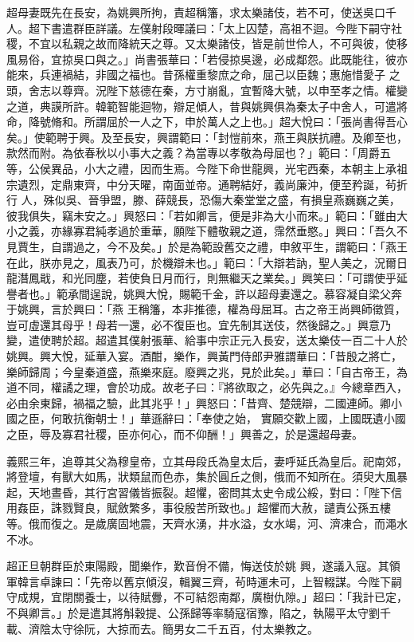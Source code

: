 \begin{pinyinscope}
 超母妻既先在長安，為姚興所拘，責超稱籓，求太樂諸伎，若不可，使送吳口千人。超下書遣群臣詳議。左僕射段暉議曰：「太上囚楚，高祖不迴。今陛下嗣守社稷，不宜以私親之故而降統天之尊。又太樂諸伎，皆是前世伶人，不可與彼，使移風易俗，宜掠吳口與之。」尚書張華曰：「若侵掠吳邊，必成鄰怨。此既能往，彼亦能來，兵連禍結，非國之福也。昔孫權重黎庶之命，屈己以臣魏；惠施惜愛子
 之頭，舍志以尊齊。況陛下慈德在秦，方寸崩亂，宜暫降大號，以申至孝之情。權變之道，典謨所許。韓範智能迴物，辯足傾人，昔與姚興俱為秦太子中舍人，可遣將命，降號脩和。所謂屈於一人之下，申於萬人之上也。」超大悅曰：「張尚書得吾心矣。」使範聘于興。及至長安，興謂範曰：「封愷前來，燕王與朕抗禮。及卿至也，款然而附。為依春秋以小事大之義？為當專以孝敬為母屈也？」範曰：「周爵五等，公侯異品，小大之禮，因而生焉。今陛下命世龍興，光宅西秦，本朝主上承祖宗遺烈，定鼎東齊，中分天曜，南面並帝。通聘結好，義尚廉沖，便至矜誕，茍折行
 人，殊似吳、晉爭盟，滕、薛競長，恐傷大秦堂堂之盛，有損皇燕巍巍之美，彼我俱失，竊未安之。」興怒曰：「若如卿言，便是非為大小而來。」範曰：「雖由大小之義，亦緣寡君純孝過於重華，願陛下體敬親之道，霈然垂愍。」興曰：「吾久不見賈生，自謂過之，今不及矣。」於是為範設舊交之禮，申敘平生，謂範曰：「燕王在此，朕亦見之，風表乃可，於機辯未也。」範曰：「大辯若訥，聖人美之，況爾日龍潛鳳戢，和光同塵，若使負日月而行，則無繼天之業矣。」興笑曰：「可謂使乎延譽者也。」範承間逞說，姚興大悅，賜範千金，許以超母妻還之。慕容凝自梁父奔于姚興，言於興曰：「燕
 王稱籓，本非推德，權為母屈耳。古之帝王尚興師徵質，豈可虛還其母乎！母若一還，必不復臣也。宜先制其送伎，然後歸之。」興意乃變，遣使聘於超。超遣其僕射張華、給事中宗正元入長安，送太樂伎一百二十人於姚興。興大悅，延華入宴。酒酣，樂作，興黃門侍郎尹雅謂華曰：「昔殷之將亡，樂師歸周；今皇秦道盛，燕樂來庭。廢興之兆，見於此矣。」華曰：「自古帝王，為道不同，權譎之理，會於功成。故老子曰：『將欲取之，必先與之。』今總章西入，必由余東歸，禍福之驗，此其兆乎！」興怒曰：「昔齊、楚競辯，二國連師。卿小國之臣，何敢抗衡朝士！」華遜辭曰：「奉使之始，
 實願交歡上國，上國既遺小國之臣，辱及寡君社稷，臣亦何心，而不仰酬！」興善之，於是還超母妻。



 義熙三年，追尊其父為穆皇帝，立其母段氏為皇太后，妻呼延氏為皇后。祀南郊，將登壇，有獸大如馬，狀類鼠而色赤，集於圓丘之側，俄而不知所在。須臾大風暴起，天地晝昏，其行宮習儀皆振裂。超懼，密問其太史令成公綏，對曰：「陛下信用姦臣，誅戮賢良，賦斂繁多，事役殷苦所致也。」超懼而大赦，譴責公孫五樓等。俄而復之。是歲廣固地震，天齊水湧，井水溢，女水竭，河、濟凍合，而澠水不冰。



 超正旦朝群臣於東陽殿，聞樂作，歎音佾不備，悔送伎於姚
 興，遂議入寇。其領軍韓言卓諫曰：「先帝以舊京傾沒，輯翼三齊，茍時運未可，上智輟謀。今陛下嗣守成規，宜閉關養士，以待賦釁，不可結怨南鄰，廣樹仇隙。」超曰：「我計已定，不與卿言。」於是遣其將斛穀提、公孫歸等率騎寇宿豫，陷之，執陽平太守劉千載、濟陰太守徐阮，大掠而去。簡男女二千五百，付太樂教之。




\end{pinyinscope}
